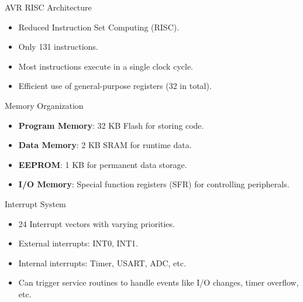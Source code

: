 \documentclass[aspectratio=169]{beamer}
\begin{document}
\begin{frame}{AVR RISC Architecture}
    \begin{itemize}
        \item <1-> Reduced Instruction Set Computing (RISC).
        \item <2-> Only 131 instructions.
        \item <3-> Most instructions execute in a single clock cycle.
        \item <4-> Efficient use of general-purpose registers (32 in total).
    \end{itemize}
\end{frame}

\begin{frame}{Memory Organization}
    \begin{itemize}
        \item \textbf{Program Memory}: 32 KB Flash for storing code.
        \item \textbf{Data Memory}: 2 KB SRAM for runtime data.
        \item \textbf{EEPROM}: 1 KB for permanent data storage.
        \item \textbf{I/O Memory}: Special function registers (SFR) for controlling peripherals.
    \end{itemize}
\end{frame}

\begin{frame}{Interrupt System}
    \begin{itemize}
        \item 24 Interrupt vectors with varying priorities.
        \item External interrupts: INT0, INT1.
        \item Internal interrupts: Timer, USART, ADC, etc.
        \item Can trigger service routines to handle events like I/O changes, timer overflow, etc.
    \end{itemize}
\end{frame}
\end{document}
